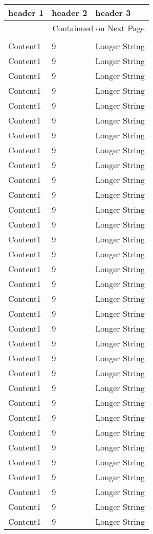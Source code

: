 \documentclass{article}%
\begin{document}
%
\normalsize%
\begin{longtable}{l l l}%
\hline%
header 1&header 2&header 3\\%
\hline%
\endhead%
\hline%
\multicolumn{3}{r}{Containued on Next Page}\\%
\hline%
\endfoot%
\hline%
\multicolumn{3}{r}{Not Containued on Next Page}\\%
\hline%
\endlastfoot%
Content1&9&Longer String\\%
Content1&9&Longer String\\%
Content1&9&Longer String\\%
Content1&9&Longer String\\%
Content1&9&Longer String\\%
Content1&9&Longer String\\%
Content1&9&Longer String\\%
Content1&9&Longer String\\%
Content1&9&Longer String\\%
Content1&9&Longer String\\%
Content1&9&Longer String\\%
Content1&9&Longer String\\%
Content1&9&Longer String\\%
Content1&9&Longer String\\%
Content1&9&Longer String\\%
Content1&9&Longer String\\%
Content1&9&Longer String\\%
Content1&9&Longer String\\%
Content1&9&Longer String\\%
Content1&9&Longer String\\%
Content1&9&Longer String\\%
Content1&9&Longer String\\%
Content1&9&Longer String\\%
Content1&9&Longer String\\%
Content1&9&Longer String\\%
Content1&9&Longer String\\%
Content1&9&Longer String\\%
Content1&9&Longer String\\%
Content1&9&Longer String\\%
Content1&9&Longer String\\%
Content1&9&Longer String\\%
Content1&9&Longer String\\%
Content1&9&Longer String\\%

\end{longtable}
\end{document}
